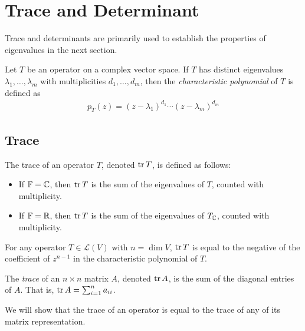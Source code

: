 \documentclass{article}
\begin{document}
\section{Trace and Determinant}

Trace and determinants are primarily used to establish the properties of eigenvalues in the next section.

\begin{definition}
  Let $T$ be an operator on a complex vector space.
  If $T$ has distinct eigenvalues $\lambda_1, \ldots, \lambda_m$ with multiplicities $d_1, \ldots, d_m$, then the \emph{characteristic polynomial} of $T$ is defined as
  \begin{align}
    p_T(z) = (z - \lambda_1)^{d_1} \cdots (z - \lambda_m)^{d_m}
  \end{align}
\end{definition}

\subsection{Trace}

\begin{definition}
  The trace of an operator $T$, denoted $\tr T$, is defined as follows:
  \begin{itemize}
    \item If $\mathbb{F} = \mathbb{C}$, then $\tr T$ is the sum of the eigenvalues of $T$, counted with multiplicity.
    \item If $\mathbb{F} = \mathbb{R}$, then $\tr T$ is the sum of the eigenvalues of $T_{\mathbb{C}}$, counted with multiplicity.
  \end{itemize}
\end{definition}

\begin{theorem}
  For any operator $T \in \mathcal{L}(V)$ with $n = \dim V$, $\tr T$ is equal to the negative of the coefficient of $z^{n - 1}$ in the characteristic polynomial of $T$.
\end{theorem}

\begin{definition}
  The \emph{trace} of an $n \times n$ matrix $A$, denoted $\trace A$, is the sum of the diagonal entries of $A$.
  That is, $\tr A = \sum_{i = 1}^n a_{ii}$.
\end{definition}

We will show that the trace of an operator is equal to the trace of any of its matrix representation.
\end{document}
